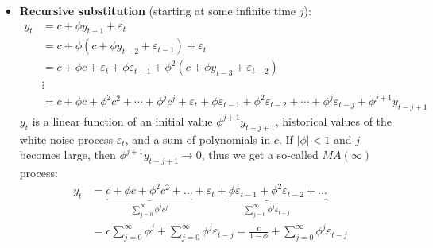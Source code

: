 \begin{enumerate}
\begin{itemize}
    \item \textbf{Recursive substitution} (starting at some infinite time \(j\)):
    \begin{align*}
    y_t &= c + \phi y_{t-1} + \varepsilon_t\\
        &= c + \phi \left( c + \phi y_{t-2} + \varepsilon_{t-1}\right) + \varepsilon_t\\ 
        &= c + \phi c + \varepsilon_t + \phi \varepsilon_{t-1} + \phi^2( c+ \phi y_{t-3} + \varepsilon_{t-2} )\\
        &\vdots\\
        & = c + \phi c + \phi^2 c^2 + \cdots + \phi^j c^j 
        + \varepsilon_t + \phi \varepsilon_{t-1} + \phi^2 \varepsilon_{t-2} + \cdots + \phi^j \varepsilon_{t-j}
        + \phi^{j+1} y_{t-{j+1}}
    \end{align*}
    \(y_t\) is a linear function of an initial value \(\phi^{j+1} y_{t-{j+1}}\),
      historical values of the white noise process \(\varepsilon_t\), and a sum of polynomials in \(c\).
    If \(|\phi|<1\) and \(j\) becomes large,
      then \( \phi^{j+1} y_{t-{j+1}} \rightarrow 0\),
      thus we get a so-called \(MA(\infty)\) process:
    \begin{align*}
    y_t &= \underbrace{c + \phi c + \phi^2 c^2 + \ldots}_{\sum_{j=0}^\infty \phi^j c^j} + \underbrace{\varepsilon_t + \phi \varepsilon_{t-1} + \phi^2 \varepsilon_{t-2} + \ldots}_{\sum_{j=0}^\infty \phi^j \varepsilon_{t-j}}
    \\
    &= c\sum_{j=0}^\infty \phi^j + \sum_{j=0}^\infty \phi^j \varepsilon_{t-j}    
    = \frac{c}{1-\phi} + \sum_{j=0}^\infty \phi^j \varepsilon_{t-j}
    \end{align*}
    


\end{itemize}
\end{enumerate}
